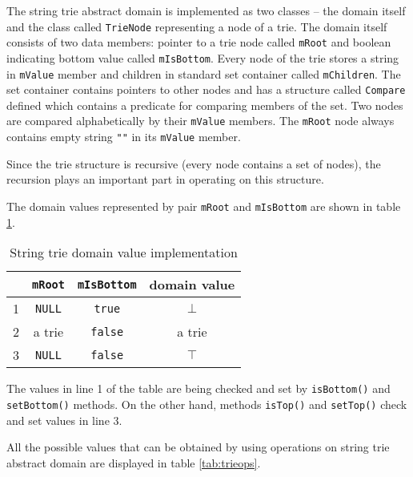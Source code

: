 \documentclass[12pt,final,oneside]{fithesis2}
\theoremstyle{definition}
\begin{document}
The string trie abstract domain is implemented as two classes -- the domain
itself and the class called \texttt{TrieNode} representing a node of a trie.
The domain itself consists of two data members: pointer to a trie node called
\texttt{mRoot} and boolean indicating bottom value called \texttt{mIsBottom}.
Every node of the trie stores a string in \texttt{mValue} member and children
in standard set container called \texttt{mChildren}. The set container contains
pointers to other nodes and has a structure called \texttt{Compare} defined
which contains a predicate for comparing members of the set. Two nodes are
compared alphabetically by their \texttt{mValue} members. The \texttt{mRoot}
node always contains empty string \texttt{""} in its \texttt{mValue} member.

Since the trie structure is recursive (every node contains a set of nodes), the
recursion plays an important part in operating on this structure.

The domain values represented by pair \texttt{mRoot} and \texttt{mIsBottom}
are shown in table \ref{tab:stringtrie}.

\begin{table}[ht]
\centering
\begin{tabular}{r|c|c|c}
  & \texttt{mRoot} & \texttt{mIsBottom} & domain value \\
\hline
1 & \texttt{NULL}  & \texttt{true}      & $\bot$ \\
2 & a trie         & \texttt{false}     & a trie \\
3 & \texttt{NULL}  & \texttt{false}     & $\top$
\end{tabular}
\caption{String trie domain value implementation}
\label{tab:stringtrie}
\end{table}

The values in line 1 of the table are being checked and set by
\texttt{isBottom()} and \texttt{setBottom()} methods. On the other hand,
methods \texttt{isTop()} and \texttt{setTop()} check and set values in line 3.

All the possible values that can be obtained by using operations on string trie
abstract domain are displayed in table \ref{tab:trieops}.
\end{document}
